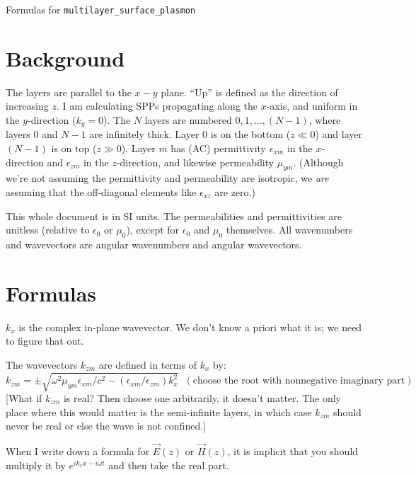\documentclass[12pt]{article}
\renewcommand{\(}{\left(}
\renewcommand{\)}{\right)}
\newcommand{\e}{\epsilon}
\begin{document}
\vspace*{0.3cm}
{\Large Formulas for \tt{multilayer\_surface\_plasmon}}

\section{Background}

The layers are parallel to the $x-y$ plane. ``Up'' is defined as the direction of increasing $z$. I am calculating SPPs propagating along the $x$-axis, and uniform in the $y$-direction ($k_y = 0$). The $N$ layers are numbered $0,1,\ldots,(N-1)$, where layers $0$ and $N-1$ are infinitely thick. Layer 0 is on the bottom ($z \ll 0$) and layer $(N-1)$ is on top ($z \gg 0$). Layer $m$ has (AC) permittivity $\e_{xm}$ in the $x$-direction and $\e_{zm}$ in the $z$-direction, and likewise permeability $\mu_{ym}$. (Although we're not assuming the permittivity and permeability are isotropic, we \emph{are} assuming that the off-diagonal elements like $\e_{xz}$ are zero.)

This whole document is in SI units. The permeabilities and permittivities are unitless (relative to $\e_0$ or $\mu_0$), except for $\e_0$ and $\mu_0$ themselves. All wavenumbers and wavevectors are angular wavenumbers and angular wavevectors.

\section{Formulas}

$k_x$ is the complex in-plane wavevector. We don't know a priori what it is; we need to figure that out.

The wavevectors $k_{zm}$ are defined in terms of $k_x$ by:
$$k_{zm} = \pm \sqrt{\omega^2 \mu_{ym} \e_{xm} / c^2 - (\e_{xm} / \e_{zm}) k_x^2} \;\; (\text{choose the root with nonnegative imaginary part})$$
[What if $k_{zm}$ is real? Then choose one arbitrarily, it doesn't matter. The only place where this would matter is the semi-infinite layers, in which case $k_{zm}$ should never be real or else the wave is not confined.]

When I write down a formula for $\vec{E}(z)$ or $\vec{H}(z)$, it is implicit that you should multiply it by $e^{i k_x x - i \omega t}$ and then take the real part.
\end{document}
